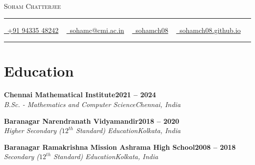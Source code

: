\documentclass[letterpaper,10pt]{article}
\newcommand{\documentTitle}[2]{
  \begin{center}
    {\Huge\scshape\color{accentTitle} #1}
    \vspace{10pt}
    {\color{accentLine} \hrule}
    \vspace{2pt}
    \footnotesize{#2}
    \vspace{2pt}
    {\color{accentLine} \hrule}
  \end{center}
}
\newcommand{\tinysection}[1]{
  \phantomsection
  \addcontentsline{toc}{section}{#1}
  {\scshape\large{\bfseries\color{accentText}#1} {\color{accentLine} |}}
}
\newcommand{\heading}[2]{
  \hspace{10pt}#1\hfill#2\\
}
\newcommand{\headingBf}[2]{
  \heading{\textbf{#1}}{\textbf{#2}}
}
\newcommand{\headingIt}[2]{
  \heading{\textit{#1}}{\textit{#2}}
}
\newenvironment{resume_list}{
  \vspace{-7pt}
  \begin{itemize}[itemsep=-2px, parsep=1pt, leftmargin=30pt]
}{
  \end{itemize}
}
\begin{document}

  \documentTitle{Soham Chatterjee}{
    \href{tel:+919433548242}{
      \raisebox{-0.05\height} \faPhone\ +91 94335 48242} ~
    \href{mailto:sohamc@cmi.ac.in}{
      \raisebox{-0.15\height} \faEnvelope\ sohamc@cmi.ac.in} ~
    \href{https://github.com/sohamch08}{
      \raisebox{-0.15\height} \faGithub\ sohamch08} ~
   \href{https://sohamch08.github.io}{
  	\raisebox{-0.15\height} \faGlobe\ sohamch08.github.io}
  }

%


  \section{Education}


\begin{resume_list}
	\item \headingBf{Chennai Mathematical Institute}{2021 -- 2024}
	\headingIt{B.Sc. - Mathematics and Computer Science}{Chennai, India}
	\item \headingBf{Baranagar Narendranath Vidyamandir}{2018 -- 2020}
	\headingIt{Higher Secondary ($12^{th}$ Standard) Education}{Kolkata, India}
	\item \headingBf{Baranagar Ramakrishna Mission Ashrama High School}{2008 -- 2018}
	\headingIt{Secondary ($12^{th}$ Standard) Education}{Kolkata, India}
\end{resume_list}
\end{document}
